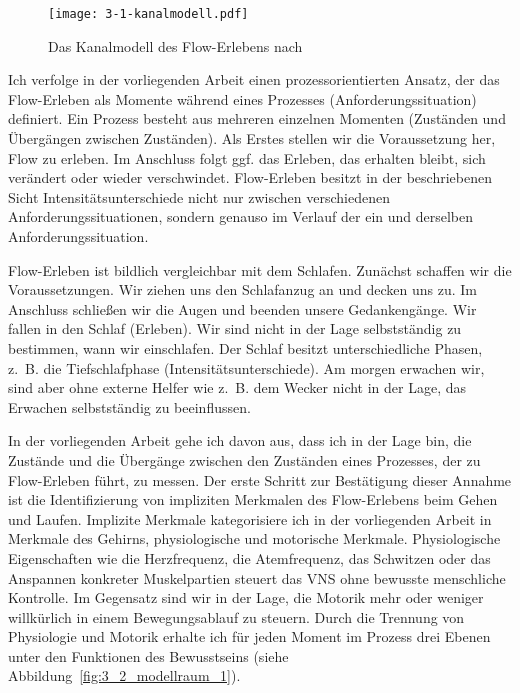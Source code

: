 \begin{figure}[t]
	\centering
		\texttt{[image: 3-1-kanalmodell.pdf]}
	\caption[Das Kanalmodell des Flow-Erlebens]{Das Kanalmodell des Flow-Erlebens nach \citet[S.~75]{Csikszentmihalyi2010}}
	\label{fig:3_1_kanalmodell}
\end{figure}

Ich verfolge in der vorliegenden Arbeit einen prozessorientierten Ansatz, der das Flow-Erleben als Momente während eines Prozesses (Anforderungssituation) definiert. Ein Prozess besteht aus mehreren einzelnen Momenten (Zuständen und Übergängen zwischen Zuständen). Als Erstes stellen wir die Voraussetzung her, Flow zu erleben. Im Anschluss folgt ggf. das Erleben, das erhalten bleibt, sich verändert oder wieder verschwindet. Flow-Erleben besitzt in der beschriebenen Sicht Intensitätsunterschiede nicht nur zwischen verschiedenen Anforderungssituationen, sondern genauso im Verlauf der ein und derselben Anforderungssituation.

Flow-Erleben ist bildlich vergleichbar mit dem Schlafen. Zunächst schaffen wir die Voraussetzungen. Wir ziehen uns den Schlafanzug an und decken uns zu. Im Anschluss schließen wir die Augen und beenden unsere Gedankengänge. Wir fallen in den Schlaf (Erleben). Wir sind nicht in der Lage selbstständig zu bestimmen, wann wir einschlafen. Der Schlaf besitzt unterschiedliche Phasen, z.~B. die Tiefschlafphase (Intensitätsunterschiede). Am morgen erwachen wir, sind aber ohne externe Helfer wie z.~B. dem Wecker nicht in der Lage, das Erwachen selbstständig zu beeinflussen.

In der vorliegenden Arbeit gehe ich davon aus, dass ich in der Lage bin, die Zustände und die Übergänge zwischen den Zuständen eines Prozesses, der zu Flow-Erleben führt, zu messen. Der erste Schritt zur Bestätigung dieser Annahme ist die Identifizierung von impliziten Merkmalen des Flow-Erlebens beim Gehen und Laufen. Implizite Merkmale kategorisiere ich in der vorliegenden Arbeit in Merkmale des Gehirns, physiologische und motorische Merkmale. Physiologische Eigenschaften wie die Herzfrequenz, die Atemfrequenz, das Schwitzen oder das Anspannen konkreter Muskelpartien steuert das \ac{VNS} ohne bewusste menschliche Kontrolle. Im Gegensatz sind wir in der Lage, die Motorik mehr oder weniger willkürlich in einem Bewegungsablauf zu steuern. Durch die Trennung von Physiologie und Motorik erhalte ich für jeden Moment im Prozess drei Ebenen unter den Funktionen des Bewusstseins (siehe Abbildung~\ref{fig:3_2_modellraum_1}).

